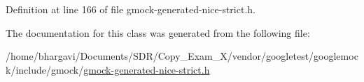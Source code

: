 Definition at line 166 of file gmock-\/generated-\/nice-\/strict.\+h.



The documentation for this class was generated from the following file\+:\begin{DoxyCompactItemize}
\item 
/home/bhargavi/\+Documents/\+S\+D\+R/\+Copy\+\_\+\+Exam\+\_\+X/vendor/googletest/googlemock/include/gmock/\hyperlink{gmock-generated-nice-strict_8h}{gmock-\/generated-\/nice-\/strict.\+h}\end{DoxyCompactItemize}
